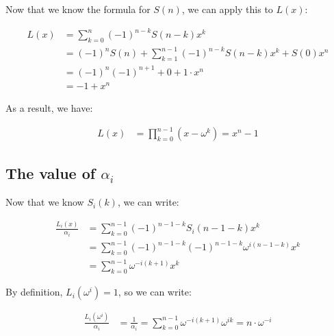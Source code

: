 \documentclass[a4paper]{article}
\begin{document}
Now that we know the formula for $S(n)$, we can apply this to $L(x)$:

\begin{equation}
  \begin{aligned}
    L(x) &= \sum_{k=0}^{n} (-1)^{n-k} S(n-k) x^k \\
         &= (-1)^n S(n) + \sum_{k=1}^{n-1} (-1)^{n-k} S(n-k) x^k + S(0) x^n \\
         &= (-1)^n (-1)^{n+1} + 0 + 1 \cdot x^n \\
         &= -1 + x^n
  \end{aligned}
\end{equation}

As a result, we have:

\begin{equation}
  \begin{aligned}
    L(x) &= \prod_{k=0}^{n-1} (x - \omega^k) = x^n - 1
  \end{aligned}
\end{equation}



\subsection{The value of $\alpha_i$}

Now that we know $S_i(k)$, we can write:

\begin{equation}
  \begin{aligned}
    \frac{L_i(x)}{\alpha_i} &= \sum_{k=0}^{n-1} (-1)^{n-1-k} S_i(n-1-k) x^k \\
                            &= \sum_{k=0}^{n-1} (-1)^{n-1-k} (-1)^{n-1-k} \omega^{i(n-1-k)} x^k \\
                            &= \sum_{k=0}^{n-1} \omega^{-i(k+1)} x^k
  \end{aligned}
\end{equation}

By definition, $L_i(\omega^i) = 1$, so we can write:

\begin{equation}
  \begin{aligned}
    \frac{L_i(\omega^i)}{\alpha_i} &= \frac{1}{\alpha_i} = \sum_{k=0}^{n-1} \omega^{-i(k+1)} \omega^{ik} = n \cdot \omega^{-i}
  \end{aligned}
\end{equation}
\end{document}
